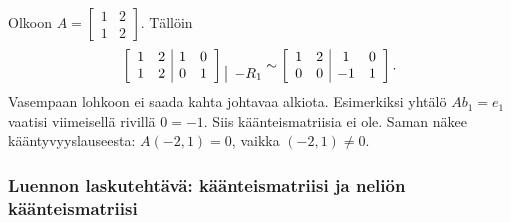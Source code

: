 \documentclass[11pt,a4paper]{amsart}
\begin{document}
  \begin{example}
    Olkoon $A=\left[
      \begin{smallmatrix}1&2\\1&2
    \end{smallmatrix}\right]$.
    Tällöin
    \[
      \left[
        \begin{array}{cc|cc}1&2&1&0\\1&2&0&1
      \end{array}\right]
      \begin{array}{@{}l@{}}\vphantom{0}\\\rowop{-R_1}
      \end{array}
      \sim
      \left[
        \begin{array}{cc|cc}1&2&1&0\\0&0&-1&1
      \end{array}\right].
    \]
    Vasempaan lohkoon ei saada kahta johtavaa alkiota. Esimerkiksi
    yhtälö $Ab_1=e_1$ vaatisi viimeisellä rivillä $0=-1$.
    Siis käänteismatriisia ei ole. Saman näkee kääntyvyyslauseesta:
    $A(-2,1)=0$, vaikka $(-2,1)\ne0$.
  \end{example}

  \subsubsection*{Luennon laskutehtävä: käänteismatriisi ja neliön
  käänteismatriisi}
\end{document}

